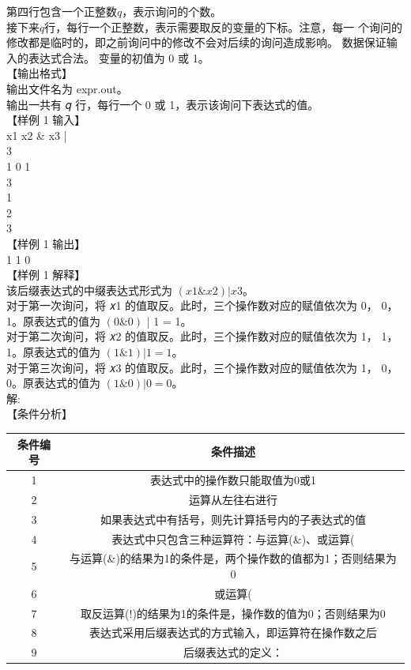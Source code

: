 \documentclass[12pt,twiside,a4paper]{ctexbook}
\numberwithin{chapter}{part}
\begin{document}
第四行包含一个正整数$q$，表示询问的个数。\\
接下来$q$行，每行一个正整数，表示需要取反的变量的下标。注意，每一
个询问的修改都是临时的，即之前询问中的修改不会对后续的询问造成影响。
数据保证输入的表达式合法。 变量的初值为 0 或 1。\\
【输出格式】\\
输出文件名为 expr.out。\\
输出一共有 𝑞 行，每行一个 0 或 1，表示该询问下表达式的值。\\
【样例 1 输入】\\
x1 x2 \& x3 |\\
3\\
1 0 1\\
3\\
1\\
2\\
3\\
【样例 1 输出】\\
1 1 0\\
【样例 1 解释】\\
该后缀表达式的中缀表达式形式为 $(𝑥1 \& 𝑥2) | 𝑥3$。\\
对于第一次询问，将 𝑥1 的值取反。此时，三个操作数对应的赋值依次为
0， 0， 1。原表达式的值为 $(0 \& 0)$ | 1 = 1。\\
对于第二次询问，将 𝑥2 的值取反。此时，三个操作数对应的赋值依次为
1， 1， 1。原表达式的值为 $(1 \& 1) | 1 = 1$。\\
对于第三次询问，将 𝑥3 的值取反。此时，三个操作数对应的赋值依次为
1， 0， 0。原表达式的值为 $(1 \& 0) | 0 = 0$。\\
解:\\
【条件分析】\\
\begin{tabular}{|c|c|}
  \hline
  条件编号 & 条件描述 \\
  \hline
  1 & 表达式中的操作数只能取值为0或1 \\
  \hline
  2 & 运算从左往右进行\\
  \hline
  3 & 如果表达式中有括号，则先计算括号内的子表达式的值 \\
  \hline
  4 & 表达式中只包含三种运算符：与运算(\&)、或运算( \\
  \hline
  5 & 与运算(\&)的结果为1的条件是，两个操作数的值都为1；否则结果为0\\
  \hline
  6 & 或运算(\\
  \hline
  7 & 取反运算(!)的结果为1的条件是，操作数的值为0；否则结果为0\\
  \hline
  8 & 表达式采用后缀表达式的方式输入，即运算符在操作数之后\\
  \hline
  9 & 后缀表达式的定义：\\
  \hline
\end{tabular}
\end{document}
